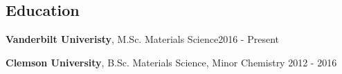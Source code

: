 \documentclass[margin, line]{res}
\newenvironment{list1}{
	\begin{list}{\ding{113}}{%
		\setlength{\itemsep}{0in}
		\setlength{\parsep}{0in} \setlength{\parskip}{0in}
		\setlength{\topsep}{0in} \setlength{\partopsep}{0in}
		\setlength{\leftmargin}{0.17in}}}{\end{list}}
\begin{document}
\begin{resume}
\section{\sc Education}
{\bf Vanderbilt Univeristy}, M.Sc. Materials Science\hfill {2016 - Present}
\\
    \vspace*{-.15in} %
    \vspace{-.3cm} %

{\bf Clemson University}, B.Sc. Materials Science, Minor Chemistry
\hfill {2012 - 2016}
\\
	\vspace*{-.15in}



\end{resume}
\end{document}
